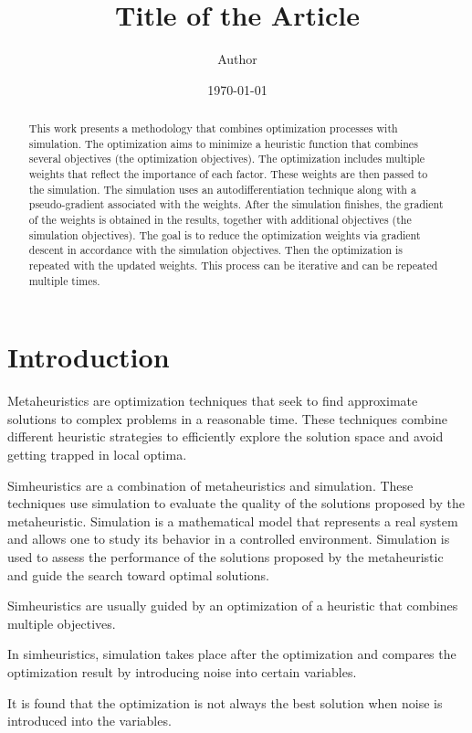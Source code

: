 \documentclass[12pt]{article}
\title{Title of the Article}
\author{Author}
\date{\today}
\begin{document}
\maketitle

\begin{abstract}
This work presents a methodology that combines optimization processes with simulation.
The optimization aims to minimize a heuristic function that combines several objectives (the optimization objectives).
The optimization includes multiple weights that reflect the importance of each factor.
These weights are then passed to the simulation.
The simulation uses an autodifferentiation technique along with a pseudo-gradient associated with the weights.
After the simulation finishes, the gradient of the weights is obtained in the results, together with additional objectives (the simulation objectives).
The goal is to reduce the optimization weights via gradient descent in accordance with the simulation objectives.
Then the optimization is repeated with the updated weights.
This process can be iterative and can be repeated multiple times.
\end{abstract}

\section{Introduction}
Metaheuristics are optimization techniques that seek to find approximate solutions to complex problems in a reasonable time. These techniques combine different heuristic strategies to efficiently explore the solution space and avoid getting trapped in local optima. 

Simheuristics are a combination of metaheuristics and simulation. These techniques use simulation to evaluate the quality of the solutions proposed by the metaheuristic. Simulation is a mathematical model that represents a real system and allows one to study its behavior in a controlled environment. Simulation is used to assess the performance of the solutions proposed by the metaheuristic and guide the search toward optimal solutions.

Simheuristics are usually guided by an optimization of a heuristic that combines multiple objectives.

In simheuristics, simulation takes place after the optimization and compares the optimization result by introducing noise into certain variables.

It is found that the optimization is not always the best solution when noise is introduced into the variables.
\end{document}
